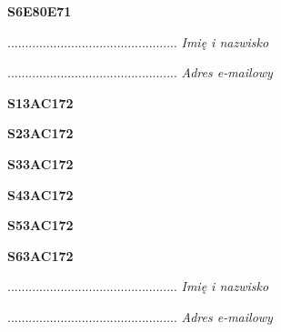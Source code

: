 \begin{turn}{90}\huge \textbf{S6E80E71}\end{turn}

\begin{turn}{90}\begin{minipage}{\linewidth} \vspace{20mm} ................................................  \textit{Imię i nazwisko}\end{minipage}\end{turn}

\begin{turn}{90}\begin{minipage}{\linewidth} \vspace{20mm} ................................................  \textit{Adres e-mailowy}\end{minipage}\end{turn}

\begin{turn}{90}\huge \textbf{S13AC172}\end{turn}

\begin{turn}{90}\huge \textbf{S23AC172}\end{turn}

\begin{turn}{90}\huge \textbf{S33AC172}\end{turn}

\begin{turn}{90}\huge \textbf{S43AC172}\end{turn}

\begin{turn}{90}\huge \textbf{S53AC172}\end{turn}

\begin{turn}{90}\huge \textbf{S63AC172}\end{turn}

\begin{turn}{90}\begin{minipage}{\linewidth} \vspace{20mm} ................................................  \textit{Imię i nazwisko}\end{minipage}\end{turn}

\begin{turn}{90}\begin{minipage}{\linewidth} \vspace{20mm} ................................................  \textit{Adres e-mailowy}\end{minipage}\end{turn}

